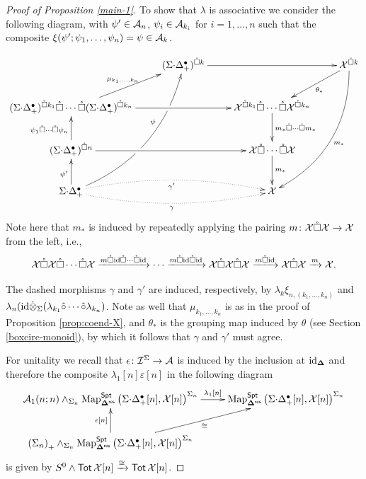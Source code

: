 \begin{proof}[Proof of Proposition \ref{main-1}]
To show that $\lambda$ is associative we consider the following diagram, with $\psi'\in \mathcal{A}_n$, $\psi_i \in \mathcal{A}_{k_i}$ for $i=1,\dots,n$ such that the composite $\xi(\psi';\psi_1,\dots,\psi_n)=\psi \in \mathcal{A}_k$. 

\[ \xymatrix{
    &(\SD_+)^{\boxcirc k} \ar[rr]%
    &&
    \Cal{X}^{\boxcirc k} \ar[dl]^-{\theta_*} \ar@/^2pc/[dddl]^{m_*}
    \\
    (\SD_+)^{\boxcirc k_1} \boxcirc \cdots \boxcirc (\SD_+)^{\boxcirc k_n} \ar[ur]^-{\mu_{k_1,\dots,k_n}} \ar[rr]%
        &&
    {\Cal{X}^{\boxcirc k_1}\boxcirc \cdots \boxcirc \Cal{X}^{\boxcirc k_n}}  \ar[d]^-{m_*\boxcirc \cdots \boxcirc m_*} &
    \\ 
    (\SD_+)^{\boxcirc n} \ar[u]^{\psi_1\boxcirc \cdots \boxcirc\psi_n} \ar[rr]%
    &&
    \Cal{X}\boxcirc \cdots \boxcirc \Cal{X} \ar[d]^-{m_*} &
    \\ 
    \SD_+ \ar[u]^<(.3){\psi'} \ar@{.>}@/^1pc/[rr]_{\gamma'} \ar@{.>}@/_1pc/[rr]_{\gamma} \ar@/_2pc/[uuur]|!{[u];[ur]}\hole|!{[uu];[uur]}\hole^<(.6){\psi}  
    &&
    \Cal{X}
    }\]
Note here that $m_*$ is induced by repeatedly applying the pairing $m\colon \mathcal{X}\mathring{\square} \mathcal{X}\to\mathcal{X}$ from the left, i.e., \[ \mathcal{X}\mathring{\square} \mathcal{X} \mathring{\square} \cdots \mathring{\square} \mathcal{X} \xrightarrow{m\mathring{\square} \mathrm{id}\mathring{\square} \cdots \mathring{\square} \mathrm{id}} \cdots \xrightarrow{m\mathring{\square} \mathrm{id}\mathring{\square}\mathrm{id}} \mathcal{X} \mathring{\square} \mathcal{X} \mathring{\square} \mathcal{X} \xrightarrow{m\mathring{\square} \mathrm{id}}\mathcal{X} \mathring{\square} \mathcal{X} \xrightarrow{m} \mathcal{X}.\] 

The dashed morphisms $\gamma$ and $\gamma'$ are induced, respectively, by  $\lambda_k \xi_{n,(k_1,\dots,k_n)}$ and $\lambda_n (\mathrm{id} \dot{\otimes}_{\Sigma} (\lambda_{k_1} \hat{\circ} \cdots \hat{\circ} \lambda_{k_n})$. Note as well that $\mu_{k_1,\dots,k_n}$ is as in the proof of Proposition \ref{prop:coend-X}, and $\theta_*$ is the grouping map induced by $\theta$ (see Section \ref{boxcirc-monoid}), by which it follows that $\gamma$ and $\gamma'$ must agree. 

For unitality we recall that  $\epsilon\colon \mathcal{I}^{\Sigma}\to \mathcal{A}$ is induced by the inclusion at $\mathrm{id}_{\mathbf{\Delta}}$ and therefore the composite $\lambda_1[n]\varepsilon[n]$ in the following diagram \[
\xymatrix{
    \Cal{A}_1(n;n) \wedge_{\Sigma_n} \Map_{\Dres}^{\Spt} \left(\SD_+[n],\Cal{X}[n]\right)^{\Sigma_n}
    \ar[r]^-{\lambda_1[n]} & \Map_{\Dres}^{\Spt}\left(\SD_+[n],\Cal{X}[n]\right)^{\Sigma_n}
    \\ 
    \left( \Sigma_n \right)_+ \wedge_{\Sigma_n} \Map_{\Dres}^{\Spt}\left(\SD_+[n],\Cal{X}[n]\right)^{\Sigma_n}
    \ar[u]^-{\epsilon[n]} \ar[ru]_-{\cong}  &
}\]
is given by $S^0\wedge \operatorname{\mathsf{Tot}} \mathcal{X}[n]\xrightarrow{\cong} \operatorname{\mathsf{Tot}} \mathcal{X}[n]$.
\end{proof}



